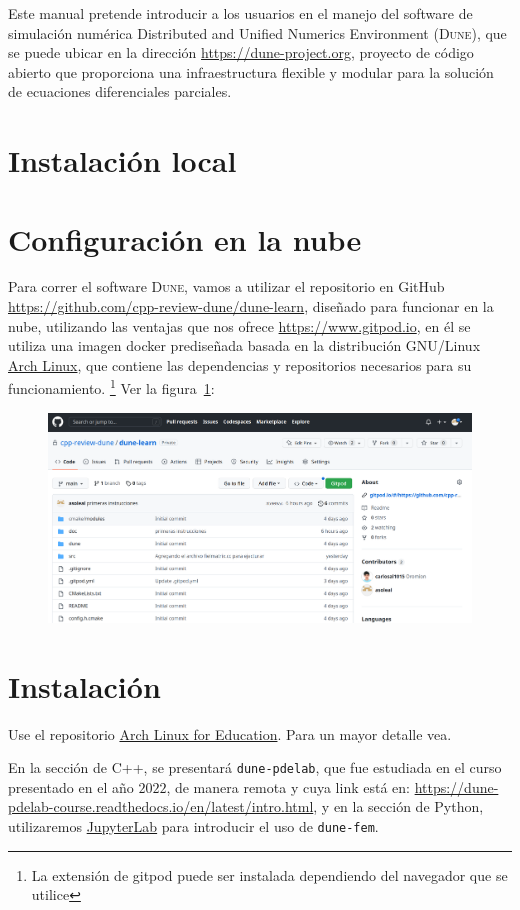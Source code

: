Este manual pretende introducir a los usuarios en el manejo del
software de simulación numérica Distributed and Unified Numerics
Environment (\textsc{Dune}), que se puede ubicar en la dirección
\url{https://dune-project.org}, proyecto de código abierto que
proporciona una infraestructura flexible y modular para la solución
de ecuaciones diferenciales parciales.

\section{Instalación local}

\section{Configuración en la nube}

Para correr el software \textsc{Dune}, vamos a utilizar el
repositorio en GitHub
\url{https://github.com/cpp-review-dune/dune-learn},
diseñado para funcionar en la nube, utilizando las ventajas que nos
ofrece \url{https://www.gitpod.io}, en él se utiliza una imagen
docker prediseñada basada en la distribución GNU/Linux
\href{https://archlinux.org}{Arch Linux}, que contiene las
dependencias y repositorios necesarios para su funcionamiento.
\footnote{
	La extensión de gitpod puede ser instalada dependiendo del
	navegador que se utilice
}
Ver la figura~\ref{fig:github01}:

\begin{figure}[ht!]
	\centering
	\includegraphics[scale=0.3,keepaspectratio]{cppreview-learn.png}
	\label{fig:github01}
\end{figure}

\section{Instalación}

Use el repositorio
\href{https://wiki.archlinux.org/title/Unofficial_user_repositories_(Espa%C3%B1ol)#arch4edu}{Arch Linux for Education}.
Para un mayor detalle vea.

En la sección de C++, se presentará \verb|dune-pdelab|, que fue
estudiada en el curso presentado en el año $2022$, de manera remota y
cuya link está en:
\url{https://dune-pdelab-course.readthedocs.io/en/latest/intro.html},
y en la sección de Python, utilizaremos
\href{https://jupyter.org}{JupyterLab} para introducir el uso de \verb|dune-fem|.
